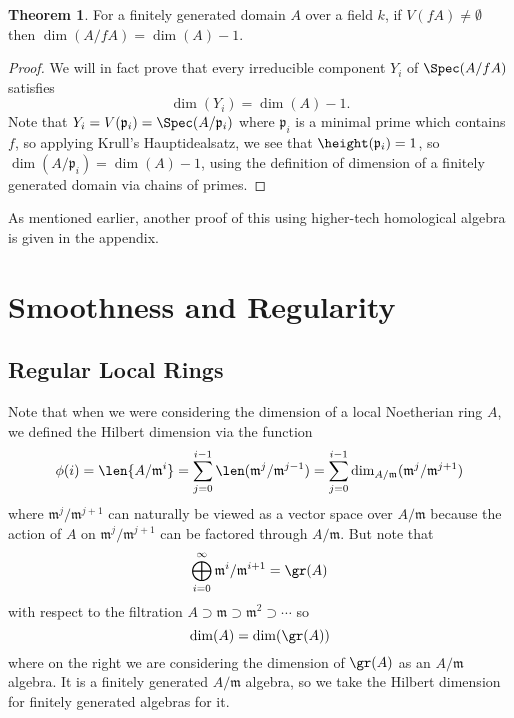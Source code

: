\documentclass[12 pt]{article}
\theoremstyle{definition}
\newtheorem{theorem}{Theorem}[section]
\newcommand\fp{{\mathfrak p}}
\begin{document}
\begin{theorem} For a finitely generated domain $A$ over a field $k$, if $V(fA) \neq \emptyset$ then $\dim(A/fA)=\dim(A)-1$.
\label{dim drop by 1}
\end{theorem}
\begin{proof} We will in fact prove that every irreducible component $Y_i$ of $\Spec(A/fA)$ satisfies \[\dim(Y_i)=\dim(A)-1.\]
Note that $Y_i=V(\fp_i)=\Spec(A/\fp_i)$ where $\fp_i$ is a minimal prime which contains $f$, so applying Krull's Hauptidealsatz, we see that $\height(\fp_i)=1$, so $\dim(A/\fp_i)=\dim(A)-1$, using the definition of dimension of a finitely generated domain via chains of primes.
\end{proof}

As mentioned earlier, another proof of this using higher-tech homological algebra is given in the appendix.




\newpage



\section{Smoothness and Regularity}

\subsection{Regular Local Rings}


Note that when we were considering the dimension of a local Noetherian ring $A$, we defined the Hilbert dimension via the function
\[\phi(i)=\len{A/\mathfrak{m}^i}=\sum_{j=0}^{i-1}\len(\mathfrak{m}^j/\mathfrak{m}^{j-1})=\sum_{j=0}^{i-1}\dim_{A/\mathfrak{m}}(\mathfrak{m}^j/\mathfrak{m}^{j+1})\]
where $\mathfrak{m}^j/\mathfrak{m}^{j+1}$ can naturally be viewed as a vector space over $A/\mathfrak{m}$ because the action of $A$ on $\mathfrak{m}^j/\mathfrak{m}^{j+1}$ can be factored through $A/\mathfrak{m}$. But note that
\[\bigoplus_{i=0}^\infty \mathfrak{m}^i/\mathfrak{m}^{i+1}=\gr(A)\]
with respect to the filtration $A \supset \mathfrak{m} \supset \mathfrak{m}^2 \supset \cdots$ so
\[\dim(A)=\dim(\gr(A))\]
where on the right we are considering the dimension of $\gr(A)$ as an $A/\mathfrak{m}$ algebra. It is a finitely generated $A/\mathfrak{m}$ algebra, so we take the Hilbert dimension for finitely generated algebras for it.
\end{document}
